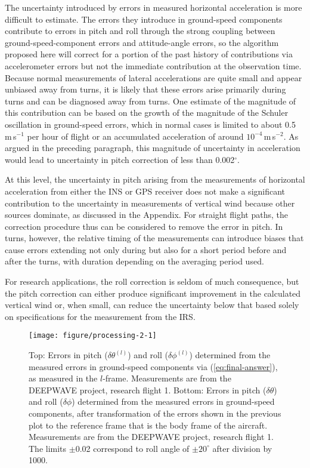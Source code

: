 \documentclass[english,british,amt,bookmarks=false,unicode=true]{copernicus}\usepackage[]{graphicx}\usepackage[]{color}
\makeatletter
\def\maxwidth{ %
  \ifdim\Gin@nat@width>\linewidth
    \linewidth
  \else
    \Gin@nat@width
  \fi
}
\newenvironment{knitrout}{}{} %
\makeatother
\begin{document}
The uncertainty introduced by errors in measured horizontal acceleration
is more difficult to estimate. The errors they introduce in ground-speed
components contribute to errors in pitch and roll through the strong
coupling between ground-speed-component errors and attitude-angle
errors, so the algorithm proposed here will correct for a portion
of the past history of contributions via accelerometer errors but
not the immediate contribution at the observation time. Because normal
measurements of lateral accelerations are quite small and appear unbiased
away from turns, it is likely that these errors arise primarily during
turns and can be diagnosed away from turns. One estimate of the magnitude
of this contribution can be based on the growth of the magnitude of
the Schuler oscillation in ground-speed errors, which in normal cases
is limited to about 0.5\,m\,s$^{-1}$ per hour of flight or an accumulated
acceleration of around $10^{-4}$\,m\,s$^{-2}$. As argued in the
preceding paragraph, this magnitude of uncertainty in acceleration
would lead to uncertainty in pitch correction of less than 0.002$^{\circ}.$

At this level, the uncertainty in pitch arising from the measurements
of horizontal acceleration from either the INS or GPS receiver does
not make a significant contribution to the uncertainty in measurements
of vertical wind because other sources dominate, as discussed in the
Appendix. For straight flight paths, the correction procedure thus
can be considered to remove the error in pitch. In turns, however,
the relative timing of the measurements can introduce biases that
cause errors extending not only during but also for a short period
before and after the turns, with duration depending on the averaging
period used.

For research applications, the roll correction is seldom of much consequence,
but the pitch correction can either produce significant improvement
in the calculated vertical wind or, when small, can reduce the uncertainty
below that based solely on specifications for the measurement from
the IRS. 



\begin{knitrout}
\color{fgcolor}\begin{figure}
\texttt{[image: figure/processing-2-1]} \caption{Top: Errors in pitch ($\delta\theta^{(l)}$) and roll ($\delta\phi^{(l)}$) determined from the measured errors in ground-speed components via (\ref{eq:final-answer}), as measured in the $l$-frame. Measurements are from the DEEPWAVE project, research flight 1. Bottom: Errors in pitch ($\delta\theta$) and roll ($\delta\phi$) determined from the measured errors in ground-speed components, after transformation of the errors shown in the previous plot to the reference frame that is the body frame of the aircraft. Measurements are from the DEEPWAVE project, research flight 1. The limits $\pm$0.02 correspond to roll angle of $\pm 20^{\circ}$ after division by 1000.}\label{fig:processing-2}
\end{figure}


\end{knitrout}
\end{document}
